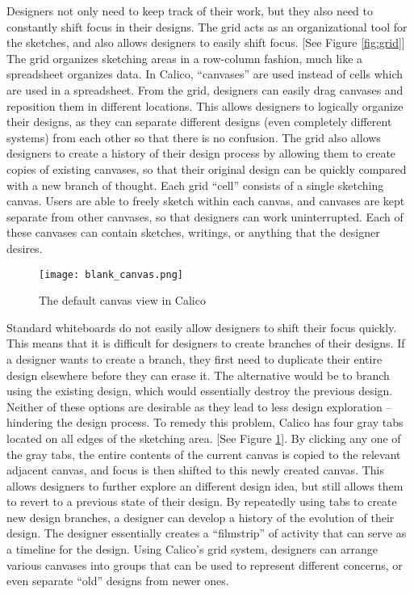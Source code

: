 Designers not only need to keep track of their work, but they also need to constantly shift focus in their designs.
The grid acts as an organizational tool for the sketches, and also allows designers to easily shift focus. [See Figure \ref{fig:grid}]
The grid organizes sketching areas in a row-column fashion, much like a spreadsheet organizes data. 
In Calico, ``canvases'' are used instead of cells which are used in a spreadsheet.
From the grid, designers can easily drag canvases and reposition them in different locations. This allows designers to logically organize their designs, as they can separate different designs (even completely different systems) from each other so that there is no confusion. 
The grid also allows designers to create a history of their design process by allowing them to create copies of existing canvases, so that their original design can be quickly compared with a new branch of thought. Each grid ``cell'' consists of a single sketching canvas. Users are able to freely sketch within each canvas, and canvases are kept separate from other canvases, so that designers can work uninterrupted. Each of these canvases can contain sketches, writings, or anything that the designer desires. 


\begin{figure}[h]
  \centering
  \texttt{[image: blank\_canvas.png]}
  \caption{The default canvas view in Calico}
  \label{fig:canvas}
\end{figure}
Standard whiteboards do not easily allow designers to shift their focus quickly. This means that it is difficult for designers to create branches of their designs. If a designer wants to create a branch, they first need to duplicate their entire design elsewhere before they can erase it. The alternative would be to branch using the existing design, which would essentially destroy the previous design. Neither of these options are desirable as they lead to less design exploration -- hindering the design process. To remedy this problem, Calico has four gray tabs located on all edges of the sketching area. [See Figure \ref{fig:canvas}]. By clicking any one of the gray tabs, the entire contents of the current canvas is copied to the relevant adjacent canvas, and focus is then shifted to this newly created canvas. This allows designers to further explore an different design idea, but still allows them to revert to a previous state of their design. By repeatedly using tabs to create new design branches, a designer can develop a history of the evolution of their design. The designer essentially creates a ``filmstrip'' of activity that can serve as a timeline for the design\cite{filmstrip}. Using Calico's grid system, designers can arrange various canvases into groups that can be used to represent different concerns, or even separate ``old'' designs from newer ones.



